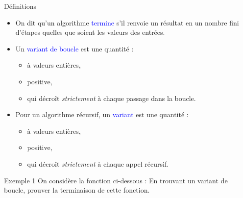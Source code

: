 \documentclass[10pt]{beamer}
\begin{document}
\begin{frame}[fragile]{\Ctitle}{\stitle}
	\begin{block}{\textcolor{gray}{\small \rappel \;} Définitions}
		\begin{itemize}
			\item<2-> On dit qu'un algorithme \textcolor{blue}{termine} s'il renvoie un résultat en un nombre fini d'étapes quelles que soient les valeurs des entrées.
			\item<3-> Un \textcolor{blue}{variant de boucle} est une quantité :
				\begin{itemize}
					\item<4-> à valeurs entières,
					\item<4-> positive,
					\item<5-> qui décroît \textit{strictement} à chaque passage dans la boucle.
				\end{itemize}
			\item<6-> Pour un algorithme récursif, un \textcolor{blue}{variant} est une quantité :
				\begin{itemize}
					\item<7-> à valeurs entières,
					\item<7-> positive,
					\item<8-> qui décroît \textit{strictement} à chaque appel récursif.
				\end{itemize}
		\end{itemize}
	\end{block}
\end{frame}

\begin{frame}[fragile]{\Ctitle}{\stitle}
	\begin{exampleblock}{Exemple 1}
		On considère la fonction ci-dessous :
		\onslide<2-> En trouvant un variant de boucle, prouver la terminaison de cette fonction.
	\end{exampleblock}
\end{frame}
\end{document}
